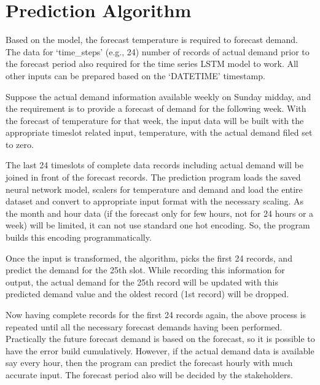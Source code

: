 \documentclass[mstat,12pt]{unswthesis}
\begin{document}
\hypertarget{prediction-algorithm}{%
\section{Prediction Algorithm}\label{prediction-algorithm}}

Based on the model, the forecast temperature is required to forecast
demand. The data for `time\_steps' (e.g., 24) number of records of
actual demand prior to the forecast period also required for the time
series LSTM model to work. All other inputs can be prepared based on the
`DATETIME' timestamp.

\bigskip

Suppose the actual demand information available weekly on Sunday midday,
and the requirement is to provide a forecast of demand for the following
week. With the forecast of temperature for that week, the input data
will be built with the appropriate timeslot related input, temperature,
with the actual demand filed set to zero.

\bigskip

The last 24 timeslots of complete data records including actual demand
will be joined in front of the forecast records. The prediction program
loads the saved neural network model, scalers for temperature and demand
and load the entire dataset and convert to appropriate input format with
the necessary scaling. As the month and hour data (if the forecast only
for few hours, not for 24 hours or a week) will be limited, it can not
use standard one hot encoding. So, the program builds this encoding
programmatically.

\bigskip

Once the input is transformed, the algorithm, picks the first 24
records, and predict the demand for the 25th slot. While recording this
information for output, the actual demand for the 25th record will be
updated with this predicted demand value and the oldest record (1st
record) will be dropped.

\bigskip

Now having complete records for the first 24 records again, the above
process is repeated until all the necessary forecast demands having been
performed. Practically the future forecast demand is based on the
forecast, so it is possible to have the error build cumulatively.
However, if the actual demand data is available say every hour, then the
program can predict the forecast hourly with much accurate input. The
forecast period also will be decided by the stakeholders.
\end{document}
